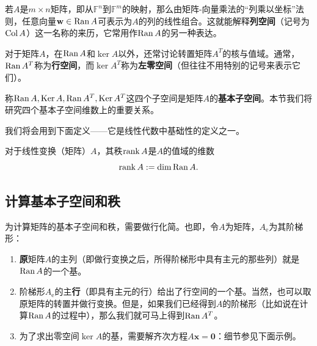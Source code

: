 若$A$是$m\times n$矩阵，即从$\mathbb{F}^{n}$到$\mathbb{F}^{m}$的映射，那么由矩阵-向量乘法的“列乘以坐标”法则，任意向量$\mathbf{w}\in\operatorname{Ran} A$可表示为$A$的列的线性组合。这就能解释{\bf 列空间}（记号为$\operatorname{Col} A$）这一名称的来历，它常用作$\operatorname{Ran} A$的另一种表达。

对于矩阵$A$，在$\operatorname{Ran} A$和$\ker A$以外，还常讨论转置矩阵$A^T$的核与值域。通常，$\operatorname{Ran} A^T$称为{\bf 行空间}，而$\ker A^T$称为{\bf 左零空间}（但往往不用特别的记号来表示它们）。

称$\operatorname{Ran} A,\operatorname{Ker} A,\operatorname{Ran} A^{T},\operatorname{Ker} A^{T}$这四个子空间是矩阵$A$的{\bf 基本子空间}。本节我们将研究四个基本子空间维数上的重要关系。

我们将会用到下面定义——它是线性代数中基础性的定义之一。
\begin{definition*}
  对于线性变换（矩阵）$A$，其秩$\operatorname{rank} A$是$A$的值域的维数\[\operatorname{rank} A:=\dim \operatorname{Ran} A.\]
\end{definition*}

\subsection{计算基本子空间和秩}

为计算矩阵的基本子空间和秩，需要做行化简。也即，令$A$为矩阵，$A_{\mathrm{e}}$为其阶梯形：
\begin{enumerate}
  \item \textbf{原}矩阵$A$的主列（即做行变换之后，所得阶梯形中具有主元的那些列）就是$\operatorname{Ran} A$的一个基。
  \item 阶梯形$A_{\mathrm{e}}$的主{\bf 行}（即具有主元的行）给出了行空间的一个基。当然，也可以取原矩阵的转置并做行变换。但是，如果我们已经得到$A$的阶梯形（比如说在计算$\operatorname{Ran} A$的过程中），那么我们就可马上得到$\operatorname{Ran} A^T$。
  \item 为了求出零空间$\ker A$的基，需要解齐次方程$A\mathbf{x}=\mathbf{0}$：细节参见下面示例。
\end{enumerate}

